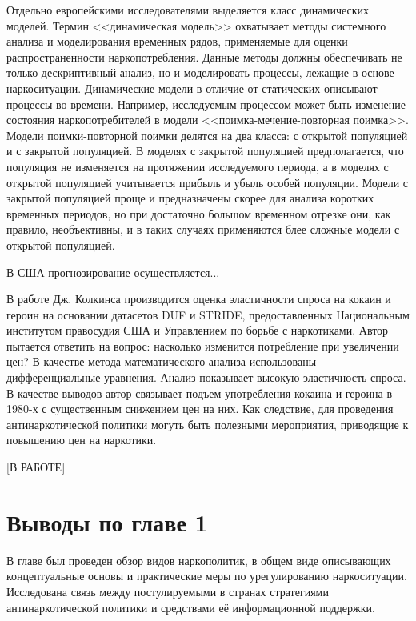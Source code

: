 Отдельно европейскими исследователями выделяется класс динамических моделей.
Термин <<динамическая модель>> охватывает методы системного анализа и
моделирования временных рядов, применяемые для оценки распространенности
наркопотребления. Данные методы должны обеспечивать не только дескриптивный
анализ, но и моделировать процессы, лежащие в основе наркоситуации. Динамические
модели в отличие от статических описывают процессы во времени. Например,
исследуемым процессом может быть изменение состояния наркопотребителей в модели
<<поимка-мечение-повторная поимка>>. Модели поимки-повторной поимки делятся на
два класса: с открытой популяцией и с закрытой популяцией. В моделях с закрытой
популяцией предполагается, что популяция не изменяется на протяжении
исследуемого периода, а в моделях с открытой популяцией учитывается прибыль и
убыль особей популяции. Модели с закрытой популяцией проще и предназначены
скорее для анализа коротких временных периодов, но при достаточно большом
временном отрезке они, как правило, необъективны, и в таких случаях применяются
блее сложные модели с открытой популяцией.

В США прогнозирование осуществляется...

В работе Дж. Колкинса \cite{Caulkins1995} производится оценка эластичности спроса 
на кокаин и героин на основании датасетов DUF и STRIDE, предоставленных
Национальным институтом правосудия США и Управлением по борьбе с наркотиками.
Автор пытается ответить на вопрос: насколько изменится потребление при
увеличении цен? В качестве метода математического анализа использованы
дифференциальные уравнения. Анализ показывает высокую эластичность спроса. В
качестве выводов автор связывает подъем употребления кокаина и героина в 1980-х
с существенным снижением цен на них. Как следствие, для проведения
антинаркотической политики могуть быть полезными мероприятия, приводящие к
повышению цен на наркотики.

[В РАБОТЕ]

\newpage
\section*{Выводы по главе 1}

В главе был проведен обзор видов наркополитик, в общем виде описывающих 
концептуальные основы и практические меры по урегулированию наркоситуации.  
Исследована связь между постулируемыми в странах стратегиями антинаркотической 
политики и средствами её информационной поддержки.

